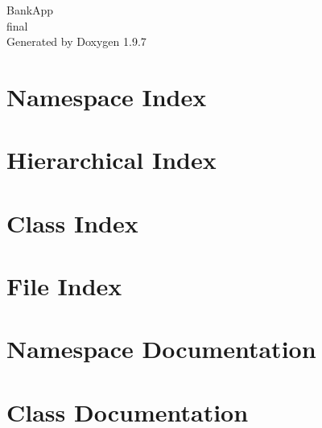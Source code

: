 \documentclass[twoside]{book}
\newcommand{\+}{\discretionary{\mbox{\scriptsize$\hookleftarrow$}}{}{}}
\newcommand{\clearemptydoublepage}{%
    \newpage{\pagestyle{empty}\cleardoublepage}%
  }
\begin{document}
  \raggedbottom
    \hypersetup{pageanchor=false,
                bookmarksnumbered=true,
                pdfencoding=unicode
               }
  \begin{titlepage}
  \vspace*{7cm}
  \begin{center}%
  {\Large Bank\+App}\\
  [1ex]\large final \\
  \vspace*{1cm}
  {\large Generated by Doxygen 1.9.7}\\
  \end{center}
  \end{titlepage}
  \clearemptydoublepage
  \tableofcontents
  \clearemptydoublepage
  \hypersetup{pageanchor=true}
\chapter{Namespace Index}

\chapter{Hierarchical Index}

\chapter{Class Index}

\chapter{File Index}

\chapter{Namespace Documentation}

\chapter{Class Documentation}




























\end{document}
